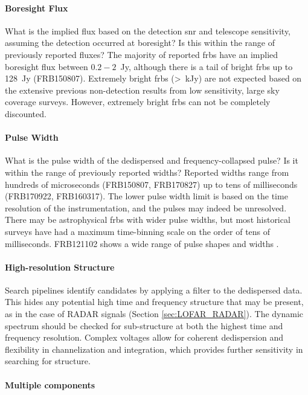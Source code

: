 \documentclass[a4paper,fleqn,usenatbib]{mnras}
\begin{document}
\paragraph{Boresight Flux}

What is the implied flux based on the detection \gls{snr} and telescope
sensitivity, assuming the detection occurred at boresight? Is this within the
range of previously reported fluxes? The majority of reported \glspl{frb} have
an implied boresight flux between $0.2-2$~Jy, although there is a tail of bright
\glspl{frb} up to 128~Jy (FRB150807). Extremely bright \glspl{frb} (>~kJy) are
not expected based on the extensive previous non-detection results from low
sensitivity, large sky coverage surveys. However, extremely bright \glspl{frb}
can not be completely discounted.

\paragraph{Pulse Width}

What is the pulse width of the dedispersed and frequency-collapsed pulse? Is it
within the range of previously reported widths? Reported widths range from
hundreds of microseconds (FRB150807, FRB170827) up to tens of milliseconds
(FRB170922, FRB160317). The lower pulse width limit is based on the time
resolution of the instrumentation, and the pulses may indeed be unresolved.
There may be astrophysical \glspl{frb} with wider pulse widths, but most
historical surveys have had a maximum time-binning scale on the order of tens of
milliseconds. FRB121102 shows a wide range of pulse shapes and widths
\citep{2018Natur.553..182M,atel10675}.

\paragraph{High-resolution Structure}

Search pipelines identify candidates by applying a filter to the dedispersed
data. This hides any potential high time and frequency structure that may be
present, as in the case of RADAR signals (Section \ref{sec:LOFAR_RADAR}). The
dynamic spectrum should be checked for sub-structure at both the highest time
and frequency resolution. Complex voltages allow for coherent dedispersion and
flexibility in channelization and integration, which provides further
sensitivity in searching for structure.

\paragraph{Multiple components}
\end{document}
